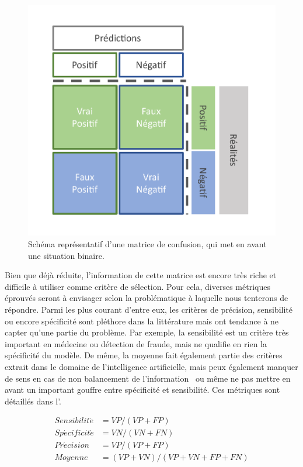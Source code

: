 \begin{figure}[H]
    \centering
    \includegraphics[width=0.6\linewidth]{contents/chapter_3/resources/scheme_confusion_matrix.pdf}
    \caption{Schéma représentatif d’une matrice de confusion, qui met en avant une situation binaire.}
    \label{fig:scheme_confusion_matrix}
\end{figure}

Bien que déjà réduite, l'information de cette matrice est encore très riche et difficile à utiliser comme critère de sélection. Pour cela, diverses métriques éprouvés seront à envisager selon la problématique à laquelle nous tenterons de répondre. Parmi les plus courant d'entre eux, les critères de précision, sensibilité ou encore spécificité sont pléthore dans la littérature mais ont tendance à ne capter qu'une partie du problème. Par exemple, la sensibilité est un critère très important en médecine ou détection de fraude, mais ne qualifie en rien la spécificité du modèle. De même, la moyenne fait également partie des critères extrait dans le domaine de l'intelligence artificielle, mais peux également manquer de sens en cas de non balancement de l'information~\cite{Guo2008} ou même ne pas mettre en avant un important gouffre entre spécificité et sensibilité. Ces métriques sont détaillés dans l'.\par

\begin{equation} 
    \label{eq:metrics_basics}
    \begin{split}
    Sensibilit\acute{e} &= VP/(VP+FP) \\	
    Sp\acute{e}cificit\acute{e} &=  VN/(VN+FN) \\
    Pr\acute{e}cision &= VP/(VP+FP) \\
    Moyenne &= (VP+VN)/(VP+VN+FP+FN)
    \end{split}
\end{equation}

